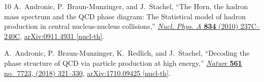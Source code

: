 \documentclass[a4paper,12pt]{article}
\numberwithin{equation}{section}
\begin{document}
\begin{thebibliography}{10}
	A.~Andronic, P.~Braun-Munzinger, and J.~Stachel, ``{The Horn, the hadron mass
		spectrum and the QCD phase diagram: The Statistical model of hadron
		production in central nucleus-nucleus collisions},''
	\href{http://dx.doi.org/10.1016/j.nuclphysa.2009.12.048}{{\em Nucl. Phys. A}
		{\bfseries 834} (2010) 237C--240C},
	\href{http://arxiv.org/abs/0911.4931}{{\ttfamily arXiv:0911.4931 [nucl-th]}}.
	
	A.~Andronic, P.~Braun-Munzinger, K.~Redlich, and J.~Stachel, ``{Decoding the
		phase structure of QCD via particle production at high energy},''
	\href{http://dx.doi.org/10.1038/s41586-018-0491-6}{{\em Nature} {\bfseries
			561} no.~7723, (2018) 321--330},
	\href{http://arxiv.org/abs/1710.09425}{{\ttfamily arXiv:1710.09425
			[nucl-th]}}.
	
\end{thebibliography}\endgroup
\end{document}
